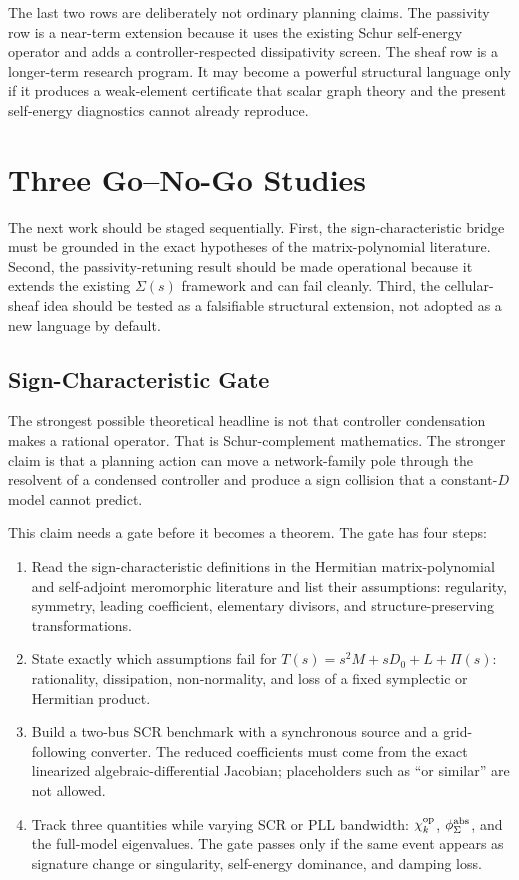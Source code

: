 \FloatBarrier

The last two rows are deliberately not ordinary planning claims. The passivity
row is a near-term extension because it uses the existing Schur self-energy
operator and adds a controller-respected dissipativity screen. The sheaf row is
a longer-term research program. It may become a powerful structural language
only if it produces a weak-element certificate that scalar graph theory and the
present self-energy diagnostics cannot already reproduce.

\section{Three Go--No-Go Studies}

The next work should be staged sequentially. First, the sign-characteristic
bridge must be grounded in the exact hypotheses of the matrix-polynomial
literature. Second, the passivity-retuning result should be made operational
because it extends the existing \(\Sigma(s)\) framework and can fail cleanly.
Third, the cellular-sheaf idea should be tested as a falsifiable structural
extension, not adopted as a new language by default.

\subsection{Sign-Characteristic Gate}

The strongest possible theoretical headline is not that controller condensation
makes a rational operator. That is Schur-complement mathematics. The stronger
claim is that a planning action can move a network-family pole through the
resolvent of a condensed controller and produce a sign collision that a
constant-\(D\) model cannot predict.

This claim needs a gate before it becomes a theorem. The gate has four steps:
\begin{enumerate}
\item Read the sign-characteristic definitions in the Hermitian
matrix-polynomial and self-adjoint meromorphic literature and list their
assumptions: regularity, symmetry, leading coefficient, elementary divisors, and
structure-preserving transformations.
\item State exactly which assumptions fail for
\(T(s)=s^2M+sD_0+L+\Pi(s)\): rationality, dissipation, non-normality, and loss
of a fixed symplectic or Hermitian product.
\item Build a two-bus SCR benchmark with a synchronous source and a
grid-following converter. The reduced coefficients must come from the exact
linearized algebraic-differential Jacobian; placeholders such as ``or similar''
are not allowed.
\item Track three quantities while varying SCR or PLL bandwidth:
\(\chi_k^{\rm op}\), \(\phi_\Sigma^{\rm abs}\), and the full-model eigenvalues.
The gate passes only if the same event appears as signature change or
singularity, self-energy dominance, and damping loss.
\end{enumerate}

